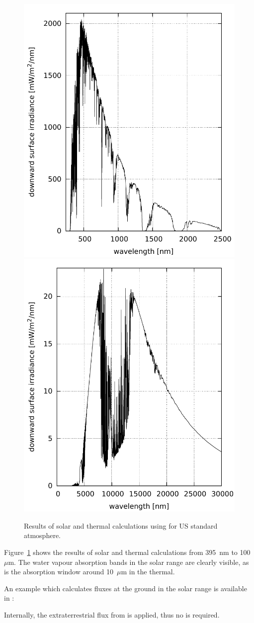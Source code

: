 \begin{figure}
  \centering
  \includegraphics[width=0.49\hsize]{./figs/reptran_solar.pdf}
  \includegraphics[width=0.49\hsize]{./figs/reptran_thermal.pdf}
  \caption{Results of solar and thermal calculations using  for US standard atmosphere.} 
  \label{fig:reptran}
\end{figure}

Figure~\ref{fig:reptran} shows the results of solar and thermal
calculations from 395~nm to 100~$\mu$m. The water vapour absorption bands in the solar range are
clearly visible, as is the absorption window around 10~$\mu$m in
the thermal. 

An example which calculates fluxes at the ground in the solar range is available in :


Internally, the extraterrestrial flux from \citet{kurucz92} is applied, thus no  is required.

